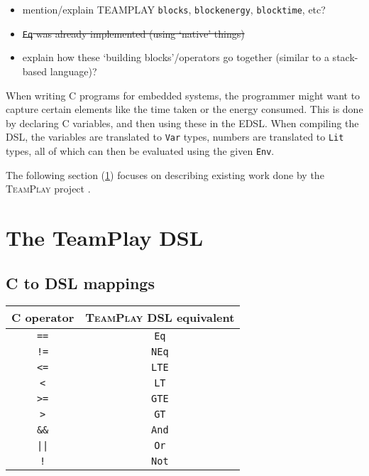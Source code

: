\begin{itemize}
	\item mention/explain TEAMPLAY \texttt{blocks}, \texttt{blockenergy},
          \texttt{blocktime}, etc?
	\item \sout{\texttt{Eq} was already implemented (using `native' things)}
    \item explain how these `building blocks'/operators go together (similar to
    	  a stack-based language)?
\end{itemize}

When writing C programs for embedded systems, the programmer might want to capture certain elements like the time taken or the energy consumed. This is done by declaring C variables, and then using these in the EDSL. When compiling the DSL, the variables are translated to \texttt{Var} types, numbers are translated to \texttt{Lit} types, all of which can then be evaluated using the given \texttt{Env}.
\\\par

The following section (\ref{des:tp-dsl}) focuses on describing existing work done by the \textsc{TeamPlay} project \cite{teamplay:d1.1}.

\section{The TeamPlay DSL}\label{des:tp-dsl}
    \subsection{C to DSL mappings}
        \begin{tabular}{c | c}
            \textbf{C operator} &   \textsc{TeamPlay} \textbf{DSL equivalent}   \\
            \hline
            \texttt{==}         &   \texttt{Eq}     \\
            \texttt{!=}         &   \texttt{NEq}    \\
            \texttt{<=}         &   \texttt{LTE}    \\
            \texttt{<}          &   \texttt{LT}     \\
            \texttt{>=}         &   \texttt{GTE}    \\
            \texttt{>}          &   \texttt{GT}     \\
            \texttt{\&\&}       &   \texttt{And}    \\
            \texttt{||}         &   \texttt{Or}     \\
            \texttt{!}          &   \texttt{Not}
        \end{tabular}
    
